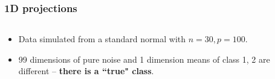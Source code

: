 \documentclass{beamer}
\begin{document}
\begin{frame}
  \frametitle{ 1D projections}
	\begin{columns}
		\begin{column}{0.4\textwidth}
		  \begin{itemize}
			  \item Data simulated from a standard normal with $n=30, p=100$.
			  \item 99 dimensions of pure noise and 1 dimension means of class 1, 2 are different -- {\bf there is a ``true" class}.
		  \end{itemize}		
			
		\end{column}
		
		\begin{column}{0.6\textwidth}
			 \begin{center}  \end{center}
		\end{column}
	\end{columns}  
\end{frame} 
\end{document}
